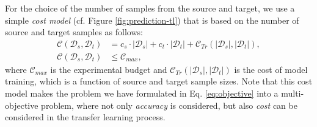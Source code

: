 
For the choice of the number of samples from the source and target, we use a simple \emph{cost model} (cf. Figure \ref{fig:prediction-tl}) that is based on the number of source and target samples as follows:
\begin{align} \label{eq:cost-model}
\mathcal{C}(\mathcal{D}_s,\mathcal{D}_t)&=c_s\cdot |\mathcal{D}_s|+c_t \cdot |\mathcal{D}_t|+\mathcal{C}_{Tr}(|\mathcal{D}_s|,|\mathcal{D}_t|), \\
\mathcal{C}(\mathcal{D}_s,\mathcal{D}_t)&\le\mathcal{C}_{max},  \label{eq:cost-constraint}
\end{align}
where $\mathcal{C}_{max}$ is the experimental budget and $\mathcal{C}_{Tr}(|\mathcal{D}_s|,|\mathcal{D}_t|)$ is the cost of model training, which is a function of source and target sample sizes.
Note that this cost model makes the problem we have formulated in Eq. \eqref{eq:objective} into a multi-objective problem, where not only \emph{accuracy} is considered, but also \emph{cost} can be considered in the transfer learning process.









